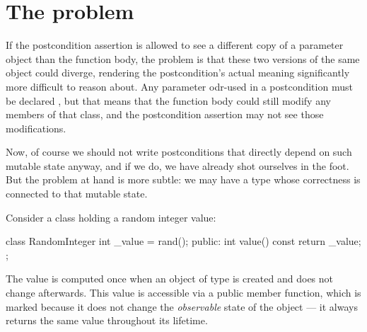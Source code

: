 \section{The problem}

If the postcondition assertion is allowed to see a different copy of a parameter object than the function body, the problem is that these two versions of the same object could diverge, rendering the postcondition's actual meaning significantly more difficult to reason about. Any parameter odr-used in a postcondition must be declared , but that means that the function body could still modify any  members of that class, and the postcondition assertion may not see those modifications.

Now, of course we should not write postconditions that directly depend on such mutable state anyway, and if we do, we have already shot ourselves in the foot. But the problem at hand is more subtle: we may have a type whose correctness is connected to that mutable state.

Consider a class  holding a random integer value:

\begin{codeblock}
class RandomInteger {
  int _value = rand();
public:
  int value() const { 
    return _value; 
  }
};
\end{codeblock}

The value is computed once when an object of type  is created and does not change afterwards. This value is accessible via a public  member function, which is marked  because it does not change the \emph{observable} state of the object --- it always returns the same value throughout its lifetime.

